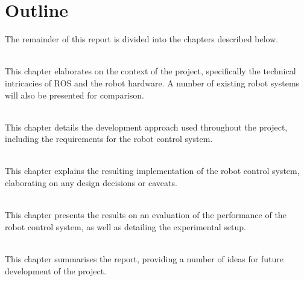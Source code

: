 
\section{Outline}

The remainder of this report is divided into the chapters described below.

\begin{description}[labelindent=\parindent]
	\item[Chapter~\ref{chap:background}: Background] \hfill \\
	This chapter elaborates on the context of the project, specifically the technical intricacies of ROS and the robot hardware. A number of existing robot systems will also be presented for comparison.

	\item[Chapter~\ref{chap:approach}: Approach] \hfill \\
	This chapter details the development approach used throughout the project, including the requirements for the robot control system.

	\item[Chapter~\ref{chap:implementation}: Implementation] \hfill \\
	This chapter explains the resulting implementation of the robot control system, elaborating on any design decisions or caveats.

	\item[Chapter~\ref{chap:evaluation}: Evaluation] \hfill \\
	This chapter presents the results on an evaluation of the performance of the robot control system, as well as detailing the experimental setup.

	\item[Chapter~\ref{chap:conclusion}: Conclusion] \hfill \\
	This chapter summarises the report, providing a number of ideas for future development of the project.
\end{description}
